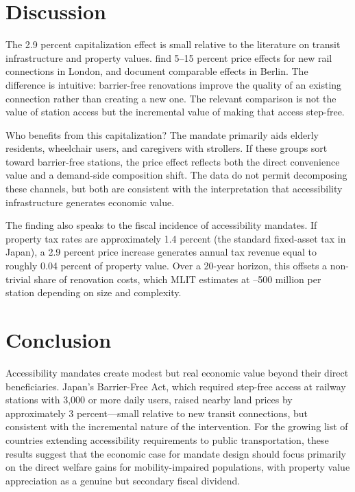 \documentclass[12pt]{article}
\begin{document}



\section{Discussion}

The 2.9 percent capitalization effect is small relative to the literature on transit infrastructure and property values. \citet{gibbons2005valuing} find 5--15 percent price effects for new rail connections in London, and \citet{ahlfeldt2015economics} document comparable effects in Berlin. The difference is intuitive: barrier-free renovations improve the quality of an existing connection rather than creating a new one. The relevant comparison is not the value of station access but the incremental value of making that access step-free.

Who benefits from this capitalization? The mandate primarily aids elderly residents, wheelchair users, and caregivers with strollers. If these groups sort toward barrier-free stations, the price effect reflects both the direct convenience value and a demand-side composition shift. The data do not permit decomposing these channels, but both are consistent with the interpretation that accessibility infrastructure generates economic value.

The finding also speaks to the fiscal incidence of accessibility mandates. If property tax rates are approximately 1.4 percent (the standard fixed-asset tax in Japan), a 2.9 percent price increase generates annual tax revenue equal to roughly 0.04 percent of property value. Over a 20-year horizon, this offsets a non-trivial share of renovation costs, which MLIT estimates at --500 million per station depending on size and complexity.


\section{Conclusion}

Accessibility mandates create modest but real economic value beyond their direct beneficiaries. Japan's Barrier-Free Act, which required step-free access at railway stations with 3,000 or more daily users, raised nearby land prices by approximately 3 percent---small relative to new transit connections, but consistent with the incremental nature of the intervention. For the growing list of countries extending accessibility requirements to public transportation, these results suggest that the economic case for mandate design should focus primarily on the direct welfare gains for mobility-impaired populations, with property value appreciation as a genuine but secondary fiscal dividend.
\end{document}
